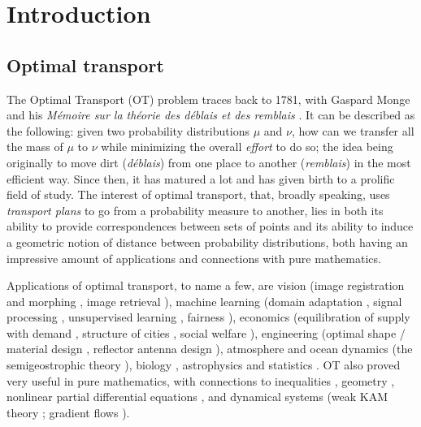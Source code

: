 


\chapter*{Introduction}
\label{sec:intro}
\section*{Optimal transport}
The Optimal Transport (OT) problem traces back to 1781, with Gaspard Monge and his \textit{Mémoire sur la théorie des déblais et des remblais} \cite{monge1781memoire}. It can be described as the following: given two probability distributions $\mu$ and $\nu$, how can we transfer all the mass of $\mu$ to $\nu$ while minimizing the overall \emph{effort} to do so; the idea being originally to move dirt (\emph{déblais}) from one place to another (\emph{remblais}) in the most efficient way. Since then, it has matured a lot and has given birth to a prolific field of study. The interest of optimal transport, that, broadly speaking, uses \emph{transport plans} to go from a probability measure to another, lies in both its ability to provide correspondences between sets of points and its ability to induce a geometric notion of distance between probability distributions, both having an impressive amount of applications and connections with pure mathematics.

Applications of optimal transport, to name a few, are vision (image registration and morphing \cite{haker2001optimal}, image retrieval \cite{rubner1998metric}), machine learning (domain adaptation \cite{courty2017joint}, signal processing \cite{kolouri2017optimal}, unsupervised learning \cite{genevay2018learning}, fairness \cite{gordaliza2019obtaining}), economics (equilibration of supply with demand \cite{chiappori2010hedonic}, structure of cities \cite{carlier2007equilibrium}, social welfare \cite{figalli2011multidimensional}), engineering (optimal shape / material design \cite{bouchitte2001characterization}, reflector antenna design \cite{glimm2003optical}), atmosphere and ocean dynamics (the semigeostrophic theory \cite{cullen2006mathematical}), biology \cite{xia2007formation,schiebinger2019optimal}, astrophysics \cite{frisch2002reconstruction} and statistics \cite{rachev1998r}. OT also proved very useful in pure mathematics, with connections to inequalities \cite{mccann1994convexity,maggi2005balls,figalli2010mass}, geometry \cite{loeper2009regularity,lott2009ricci}, nonlinear partial differential equations \cite{brenier1987decomposition}, and dynamical systems (weak KAM theory \cite{bernard2007optimal}; gradient flows \cite{ambrosio2005gradient}).

